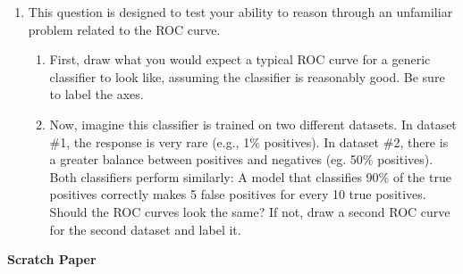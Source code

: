 \documentclass[11pt]{article}
\begin{document}
\begin{enumerate}[leftmargin=*]
\begin{enumerate}[label=\alph*)]
  \item Using past browsing behavior, can we predict whether a user will click on a particular online ad? 
  \vspace{1cm}    
  \item What is the effect of raising the minimum wage on employment among low-wage workers? 
  \vspace{1cm}  
  \item If a firm doubles its TV advertising budget, by how much will its sales change, holding all else equal?
  \vspace{1cm}  
  \item Given a customer’s credit history and demographics, what is the probability that they will default on their loan next month?
\end{enumerate}




\clearpage
\item This question is designed to test your ability to reason through an unfamiliar problem related to the ROC curve. 
\begin{enumerate}
  \item First, draw what you would expect a typical ROC curve for a generic classifier to look like, assuming the classifier is reasonably good. Be sure to label the axes. 
  \item Now, imagine this classifier is trained on two different datasets. In dataset \#1, the response is very rare (e.g., 1\% positives). In dataset \#2, there is a greater balance between positives and negatives (eg. 50\% positives). Both classifiers perform similarly: A model that classifies 90\% of the true positives correctly makes 5 false positives for every 10 true positives. Should the ROC curves look the same? If not, draw a second ROC curve for the second dataset and label it. 
\end{enumerate}

\end{enumerate}

\clearpage \newpage     

\begin{center}\textbf{Scratch Paper}\end{center}

\noindent
\vspace{16cm}
\end{document}
